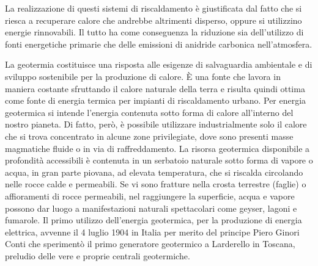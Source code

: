 \documentclass[laurea,oneside,11pt]{USiena_tesiLM}
\begin{document}
La realizzazione di questi sistemi di riscaldamento è giustificata dal fatto che si riesca a recuperare calore che andrebbe altrimenti disperso, oppure si utilizzino energie rinnovabili. Il tutto ha come conseguenza la riduzione sia dell'utilizzo di fonti energetiche primarie che delle emissioni di anidride carbonica nell'atmosfera.

La geotermia costituisce una risposta alle esigenze di salvaguardia ambientale e di sviluppo sostenibile per la produzione di calore. È una fonte che lavora in maniera costante sfruttando il calore naturale della terra e risulta quindi ottima come fonte di energia termica per impianti di riscaldamento urbano.
Per energia geotermica si intende l'energia contenuta sotto forma di calore all'interno del nostro pianeta. Di fatto, però, è possibile utilizzare industrialmente solo il calore che si trova concentrato in alcune zone privilegiate, dove sono presenti masse magmatiche fluide o in via di raffreddamento. La risorsa geotermica disponibile a profondità accessibili è contenuta in un serbatoio naturale sotto forma di vapore o acqua, in gran parte piovana, ad elevata temperatura, che si riscalda circolando nelle rocce calde e permeabili. Se vi sono fratture nella crosta terrestre (faglie) o affioramenti di rocce permeabili, nel raggiungere la superficie, acqua e vapore possono dar luogo a manifestazioni naturali spettacolari come geyser, lagoni e fumarole.
Il primo utilizzo dell'energia geotermica, per la produzione di energia elettrica, avvenne il 4 luglio 1904 in Italia per merito del principe Piero Ginori Conti che sperimentò il primo generatore geotermico a Larderello in Toscana, preludio delle vere e proprie centrali geotermiche.
  
\end{document}
